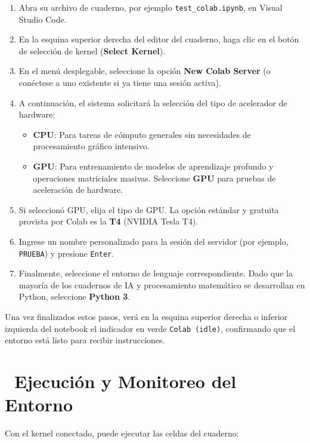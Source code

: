 \documentclass[11pt,a4paper]{article}
\newcommand{\iconotexto}[2]{\textcolor{cyanNeon}{\faIcon{#1}}~#2}
\begin{document}
\begin{enumerate}
    \item Abra su archivo de cuaderno, por ejemplo \texttt{test\_colab.ipynb}, en Visual Studio Code.
    \item En la esquina superior derecha del editor del cuaderno, haga clic en el botón de selección de kernel (\textbf{Select Kernel}).
    \item En el menú desplegable, seleccione la opción \textbf{New Colab Server} (o conéctese a uno existente si ya tiene una sesión activa).
    \item A continuación, el sistema solicitará la selección del tipo de acelerador de hardware:
    \begin{itemize}
        \item \textbf{CPU}: Para tareas de cómputo generales sin necesidades de procesamiento gráfico intensivo.
        \item \textbf{GPU}: Para entrenamiento de modelos de aprendizaje profundo y operaciones matriciales masivas. Seleccione \textbf{GPU} para pruebas de aceleración de hardware.
    \end{itemize}
    \item Si seleccionó GPU, elija el tipo de GPU. La opción estándar y gratuita provista por Colab es la \textbf{T4} (NVIDIA Tesla T4).
    \item Ingrese un nombre personalizado para la sesión del servidor (por ejemplo, \texttt{PRUEBA}) y presione \texttt{Enter}.
    \item Finalmente, seleccione el entorno de lenguaje correspondiente. Dado que la mayoría de los cuadernos de IA y procesamiento matemático se desarrollan en Python, seleccione \textbf{Python 3}.
\end{enumerate}

Una vez finalizados estos pasos, verá en la esquina superior derecha o inferior izquierda del notebook el indicador en verde \texttt{Colab (idle)}, confirmando que el entorno está listo para recibir instrucciones.

\section[Ejecución y Monitoreo del Entorno]{\iconotexto{play-circle}{Ejecución y Monitoreo del Entorno}}

Con el kernel conectado, puede ejecutar las celdas del cuaderno:
\end{document}
